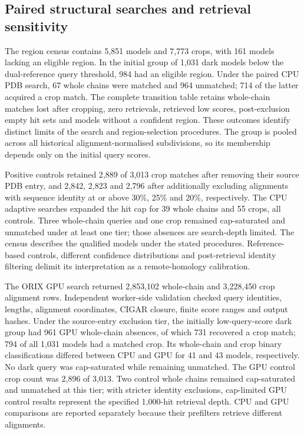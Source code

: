 
\subsection*{Paired structural searches and retrieval sensitivity}
The region census contains 5{,}851 models and 7{,}773 crops, with 161 models lacking an eligible
region. In the initial group of 1{,}031 dark models below the dual-reference query threshold,
984 had an eligible region. Under the paired CPU PDB search, 67 whole chains were matched and
964 unmatched; 714 of the latter acquired a crop match. The complete transition table retains
whole-chain matches lost after cropping, zero retrievals, retrieved low scores, post-exclusion
empty hit sets and models without a confident region. These outcomes identify distinct
limits of the search and region-selection procedures. The group is pooled across all historical
alignment-normalised subdivisions, so its membership depends only on the initial query scores.

Positive controls retained 2{,}889 of 3{,}013 crop matches after removing their source PDB entry,
and 2{,}842, 2{,}823 and 2{,}796 after additionally excluding alignments with sequence identity
at or above 30\%, 25\% and 20\%, respectively. The CPU adaptive searches expanded the hit cap
for 39 whole chains and 55 crops, all controls. Three whole-chain queries and one crop remained
cap-saturated and unmatched under at least one tier; those absences are search-depth limited.
The census describes the qualified models under the stated procedures. Reference-based
controls, different confidence distributions and post-retrieval identity filtering delimit
its interpretation as a remote-homology calibration.

The ORIX GPU search returned 2{,}853{,}102 whole-chain and 3{,}228{,}450 crop alignment rows.
Independent worker-side validation checked query identities, lengths, alignment coordinates,
CIGAR closure, finite score ranges and output hashes. Under the source-entry exclusion tier,
the initially low-query-score dark group had 961 GPU whole-chain absences, of which 731
recovered a crop match; 794 of all 1{,}031 models had a matched crop. Its whole-chain and crop
binary classifications differed between CPU and GPU for 41 and 43 models, respectively.
No dark query was cap-saturated while remaining unmatched. The GPU control crop count was
2{,}896 of 3{,}013. Two control whole chains remained cap-saturated and unmatched at this tier;
with stricter identity exclusions, cap-limited GPU control results represent the specified
1{,}000-hit retrieval depth. CPU and GPU comparisons are reported separately because their
prefilters retrieve different alignments.

